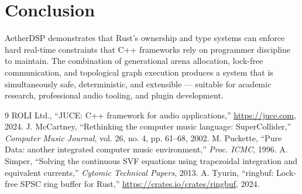 \documentclass[conference]{IEEEtran}
\begin{document}
\section{Conclusion}

AetherDSP demonstrates that Rust's ownership and type systems can enforce hard
real-time constraints that C++ frameworks rely on programmer discipline to
maintain. The combination of generational arena allocation, lock-free
communication, and topological graph execution produces a system that is
simultaneously safe, deterministic, and extensible — suitable for academic
research, professional audio tooling, and plugin development.

\begin{thebibliography}{9}
  ROLI Ltd., ``JUCE: C++ framework for audio applications,''
  \url{https://juce.com}, 2024.
  J. McCartney, ``Rethinking the computer music language: SuperCollider,''
  \textit{Computer Music Journal}, vol. 26, no. 4, pp. 61--68, 2002.
  M. Puckette, ``Pure Data: another integrated computer music environment,''
  \textit{Proc. ICMC}, 1996.
  A. Simper, ``Solving the continuous SVF equations using trapezoidal
  integration and equivalent currents,'' \textit{Cytomic Technical Papers},
  2013.
  A. Tyurin, ``ringbuf: Lock-free SPSC ring buffer for Rust,''
  \url{https://crates.io/crates/ringbuf}, 2024.
\end{thebibliography}
\end{document}
